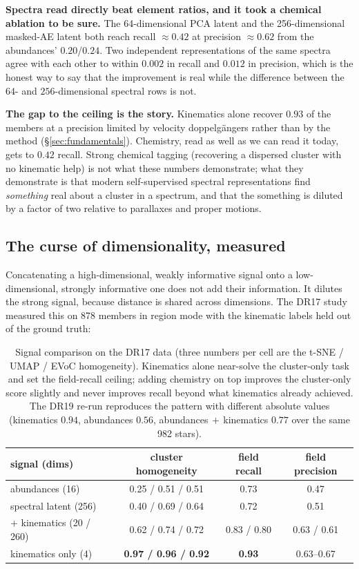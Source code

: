 \textbf{Spectra read directly beat element ratios, and it took a chemical
ablation to be sure.} The 64-dimensional PCA latent and the 256-dimensional
masked-AE latent both reach recall $\approx 0.42$ at precision $\approx 0.62$
from the abundances' $0.20$/$0.24$. Two independent representations of the same
spectra agree with each other to within $0.002$ in recall and $0.012$ in
precision, which is the honest way to say that the improvement is real while
the difference between the $64$- and $256$-dimensional spectral rows is not.

\textbf{The gap to the ceiling is the story.} Kinematics alone recover $0.93$
of the members at a precision limited by velocity doppelg\"angers rather than
by the method (\S\ref{sec:fundamentals}). Chemistry, read as well as we can
read it today, gets to $0.42$ recall. Strong chemical tagging (recovering a
dispersed cluster with no kinematic help) is not what these numbers
demonstrate; what they demonstrate is that modern self-supervised spectral
representations find \emph{something} real about a cluster in a spectrum, and
that the something is diluted by a factor of two relative to parallaxes and
proper motions.

\subsection{The curse of dimensionality, measured}

Concatenating a high-dimensional, weakly informative signal onto a
low-dimensional, strongly informative one does not add their information. It
dilutes the strong signal, because distance is shared across dimensions. The
DR17 study measured this on 878 members in region mode with the kinematic
labels held out of the ground truth:

\begin{table}[htbp]
\centering
\small
{}
\begin{tabular}{@{}lccc@{}}
\toprule
signal (dims) & cluster homogeneity & field recall & field precision \\
\midrule
abundances (16)          & 0.25 / 0.51 / 0.51 & 0.73 & 0.47 \\
spectral latent (256)    & 0.40 / 0.69 / 0.64 & 0.72 & 0.51 \\
+ kinematics (20 / 260)  & 0.62 / 0.74 / 0.72 & 0.83 / 0.80 & 0.63 / 0.61 \\
kinematics only (4)      & \textbf{0.97 / 0.96 / 0.92} & \textbf{0.93} & 0.63--0.67 \\
\bottomrule
\end{tabular}
\caption{Signal comparison on the DR17 data (three numbers per cell are the
t-SNE / UMAP / EVoC homogeneity). Kinematics alone near-solve the cluster-only
task and set the field-recall ceiling; adding chemistry on top improves the
cluster-only score slightly and never improves recall beyond what kinematics
already achieved. The DR19 re-run reproduces the pattern with different
absolute values (kinematics $0.94$, abundances $0.56$,
abundances$\,+\,$kinematics $0.77$ over the same 982 stars).}
\label{tab:curse}
\end{table}

